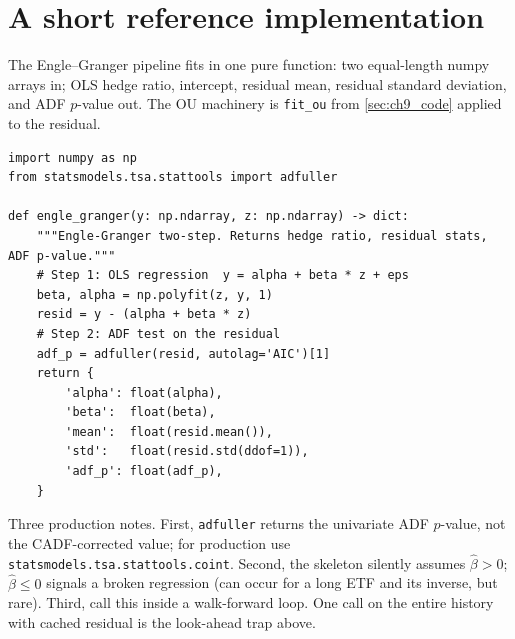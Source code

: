 \section{A short reference implementation}
\label{sec:ch10_code}

The Engle--Granger pipeline fits in one pure function: two
equal-length numpy arrays in; OLS hedge ratio, intercept, residual
mean, residual standard deviation, and ADF $p$-value out. The OU
machinery is \texttt{fit\_ou} from \cref{sec:ch9_code} applied to
the residual.

\begin{lstlisting}[caption={Engle--Granger two-step as a pure function.}]
import numpy as np
from statsmodels.tsa.stattools import adfuller

def engle_granger(y: np.ndarray, z: np.ndarray) -> dict:
    """Engle-Granger two-step. Returns hedge ratio, residual stats, ADF p-value."""
    # Step 1: OLS regression  y = alpha + beta * z + eps
    beta, alpha = np.polyfit(z, y, 1)
    resid = y - (alpha + beta * z)
    # Step 2: ADF test on the residual
    adf_p = adfuller(resid, autolag='AIC')[1]
    return {
        'alpha': float(alpha),
        'beta':  float(beta),
        'mean':  float(resid.mean()),
        'std':   float(resid.std(ddof=1)),
        'adf_p': float(adf_p),
    }
\end{lstlisting}

Three production notes. First, \texttt{adfuller} returns the
univariate ADF $p$-value, not the CADF-corrected value; for
production use \texttt{statsmodels.tsa.stattools.coint}. Second,
the skeleton silently assumes $\hat\beta > 0$; $\hat\beta \leq 0$
signals a broken regression (can occur for a long ETF and its
inverse, but rare). Third, call this inside a walk-forward loop.
One call on the entire history with cached residual is the
look-ahead trap above.

